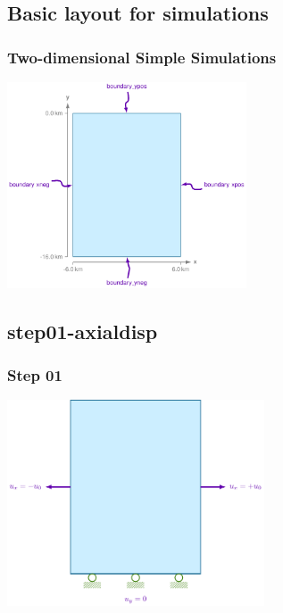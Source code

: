 \documentclass[aspectratio=169]{beamer}
\begin{document}
\subsection{Basic layout for simulations}

\begin{frame}
  \frametitle{Two-dimensional Simple Simulations}
  \summary{}

  \vfill
  \begin{center}
      \includegraphics[height=6.1cm]{figs/geometry}
  \end{center}
  \vfill

\end{frame}


\subsection{step01-axialdisp}

\begin{frame}
  \frametitle{Step 01}

  \vfill
  \begin{center}
      \includegraphics[height=6.1cm]{figs/step01-diagram}
  \end{center}
\vfill
      
\end{frame}
\end{document}
